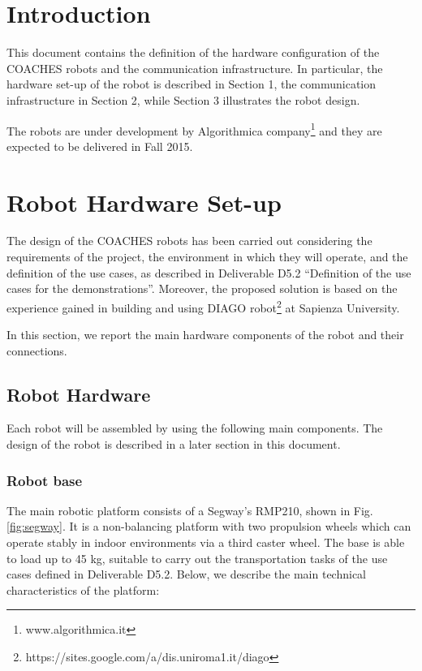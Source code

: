 \section*{Introduction}

This document contains the definition of the hardware configuration of the COACHES robots and the communication infrastructure. In particular, the hardware set-up of the robot is described in Section 1, the communication infrastructure in Section 2, while Section 3 illustrates the robot design.

The robots are under development by Algorithmica company\footnote{www.algorithmica.it} and they are expected to be delivered in Fall 2015.


\section{Robot Hardware Set-up}

The design of the COACHES robots has been carried out considering the requirements of the project, the environment in which they will operate, and the definition of the use cases, as described in Deliverable D5.2 ``Definition of the use cases for the demonstrations''.
Moreover, the proposed solution is based on the experience gained in building and using DIAGO robot\footnote{https://sites.google.com/a/dis.uniroma1.it/diago} at Sapienza University.

In this section, we report the main hardware components of the robot and their connections.


\subsection{Robot Hardware}

Each robot will be assembled by using the following main components.
The design of the robot is described in a later section in this document.


\subsubsection{Robot base}
The main robotic platform consists of a Segway's RMP210, shown in Fig. \ref{fig:segway}.
It is a non-balancing platform with two propulsion wheels which can operate stably in indoor environments via a third caster wheel. The base is able to load up to 45 kg, suitable to carry out the transportation tasks of the use cases defined in Deliverable D5.2. Below, we describe the main technical characteristics of the platform:


